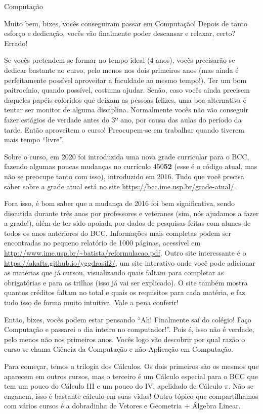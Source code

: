 \begin{subsecao}{Computação}

Muito bem, bixes, vocês conseguiram passar em Computação! Depois de tanto
esforço e dedicação, vocês vão finalmente poder descansar e relaxar, certo?
Errado!

Se vocês pretendem se formar no tempo ideal (4 anos), vocês precisarão se
dedicar bastante ao curso, pelo menos nos dois primeiros anos (mas ainda é
perfeitamente possível aproveitar a faculdade ao mesmo tempo!). Ter um bom
paitrocínio, quando possível, costuma ajudar. Senão, caso vocês ainda precisem
daqueles papéis coloridos que deixam as pessoas felizes, uma boa alternativa é
tentar ser monitor de alguma disciplina. Normalmente vocês não vão conseguir 
fazer estágios de verdade antes do 3º ano, por causa das aulas do período da tarde. 
Então aproveitem o curso! Preocupem-se em trabalhar quando tiverem mais tempo ``livre''.

Sobre o curso, em 2020 foi introduzida uma nova grade curricular para o BCC,
fazendo algumas poucas mudanças no currículo 450\textbf{52} (esse é o código
atual, mas não se preocupe tanto com isso), introduzido em 2016. Tudo que você
precisa saber sobre a grade atual está no site \url{https://bcc.ime.usp.br/grade-atual/}.

Fora isso, é bom saber que a mudança de 2016 foi bem significativa, sendo
discutida durante três anos por professores e veteranes (sim, nós ajudamos a
fazer a grade!), além de ter sido apoiada por dados de pesquisas feitas com
alunes de todos os anos anteriores do BCC. Informações mais completas podem
ser encontradas no pequeno relatório de 1000 páginas, acessível em
\url{http://www.ime.usp.br/~batista/reformulacao.pdf}. Outro site interessante é o 
\url{https://akafts.github.io/yggdrasil2/}, um
site interativo onde você pode adicionar as matérias que já cursou,
visualizando quais faltam para completar as obrigatórias e para as trilhas
(isso já vai ser explicado). O site também mostra quantos créditos faltam no
total e quais os requisitos para cada matéria, e faz tudo isso de forma muito
intuitiva. Vale a pena conferir!

Então, bixes, vocês podem estar pensando ``Ah! Finalmente saí do colégio! Faço
Computação e passarei o dia inteiro no computador!''. Pois é, isso não é
verdade, pelo menos não nos primeiros anos. Vocês logo vão descobrir por qual
razão o curso se chama Ciência da Computação e não Aplicação em Computação.

Para começar, temos a trilogia dos Cálculos. Os dois primeiros são os mesmos
que aparecem em outros cursos, mas o terceiro é um Cálculo especial para o BCC
que tem um pouco do Cálculo III e um pouco do IV, apelidado de Cálculo $\pi$.
Não se enganem, isso é bastante cálculo em suas vidas! Outro tópico que
compartilhamos com vários cursos é a dobradinha de Vetores e Geometria $+$
Álgebra Linear. 


\end{subsecao}
